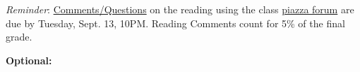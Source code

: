 \documentclass[handout]{mcs}
\begin{document}
\renewcommand{\reading}{Part~\bref{part:proofs}{. \emph{Proofs:
      Introduction}}, Chapter~\bref{proofs_chap}{, \emph{What is a
      Proof?}}; Chapter~\bref{well_ordering_chap}{, \emph{The Well
      Ordering Principle}}; and Chapter~\bref{logicform_chap}{ through
    \bref{SAT_sec}{, covering \emph{Propositional Logic}}}.  These
  assigned readings \textbf{do not include the Problem sections}.  (Many
  of the problems in the text will appear as class or homework problems.)}


\emph{Reminder}:
\href{http://courses.csail.mit.edu/6.042/fall11/courseinfo#comments}{
  Comments/Questions} on the reading using the class
\href{http://www.piazza.com/mit/fall2011/6042j18062j}{piazza forum} are due
by Tuesday, Sept. 13, 10PM.  Reading Comments count for 5\% of the
final grade.







\begin{center}
\large \textbf{Optional:}
\end{center}


\end{document}
